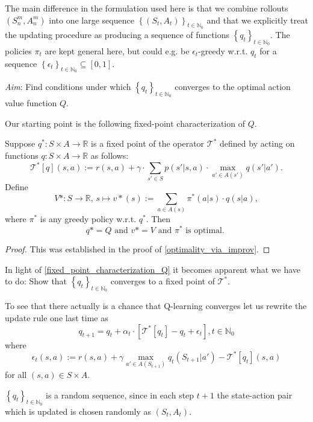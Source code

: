 The main difference in the formulation used here is that we combine rollouts \( \left( S_n^m, A_n^m \right) \) into one large sequence \( \left\{ \left( S_t, A_t \right) \right\}_{t \in \mathbb{N}_{0}} \) and that we explicitly treat the updating procedure as producing a sequence of functions \( \left\{ q_t \right\}_{t \in \mathbb{N}_{0}} \). The policies \( \pi_t \) are kept general here, but could e.g. be \( \epsilon_{t} \)-greedy w.r.t. \( q_{t} \) for a sequence \( \left\{ \epsilon_{t} \right\}_{t \in \mathbb{N}_{0}} \subseteq [0,1] \).

\emph{Aim}: Find conditions under which \( \left\{ q_t \right\}_{t \in \mathbb{N}_{0}} \) converges to the optimal action value function \( Q \).

Our starting point is the following fixed-point characterization of \( Q \).

\begin{corollary}\label{fixed_point_characterization_Q}
Suppose \( q^* : S \times A \to \mathbb{R} \) is a fixed point of the operator \( \mathcal{T}^{*} \) defined by acting on functions \( q: S \times A \to \mathbb{R} \) as follows:
\[
    \mathcal{T}^*[q](s,a) := r(s,a) + \gamma \cdot \sum_{s' \in S} p(s'|s, a) \cdot \max_{a' \in A(s')} q(s' | a').
\]
Define
\[
     V*: S \to \mathbb{R},\, s \mapsto v*(s) := \sum_{a \in A(s)} \pi^* (a|s) \cdot q(s|a),
\]
where \( \pi^* \) is any greedy policy w.r.t. \( q^* \). Then 
\[
    q* = Q \text{  and  } v* = V \text{ and } \pi^* \text{ is optimal. }
\]
\end{corollary}


\begin{proof}
This was established in the proof of \cref{optimality_via_improv}.    
\end{proof}

In light of \cref{fixed_point_characterization_Q} it becomes apparent what we have to do:
Show that \( \left\{ q_t \right\}_{t \in \mathbb{N}_{0}} \) converges to a fixed point of \( \mathcal{T}^* \).  

To see that there actually is a chance that Q-learning converges let us rewrite the update rule one last time as 
\[
    q_{t+1} = q_{t} + \alpha_{t} \cdot \left[ \mathcal{T}^*[q_{t}] - q_{t} + \epsilon_{t} \right], t \in \mathbb{N}_{0}
\]
where 
\[
    \epsilon_{t}(s,a) := r(s,a) + \gamma \max_{a' \in A(S_{t+1})} q_{t}(S_{t+1}| a') - \mathcal{T}^{*}[q_{t}](s,a)
\]
for all \( (s,a) \in S \times A \).

\begin{remark}
\( \left\{ q_{t} \right\}_{t \in \mathbb{N}_{0}} \) is a random sequence, since in each step \( t+1 \) the state-action pair which is updated is chosen randomly as \( (S_{t},A_{t}) \).       
\end{remark}

